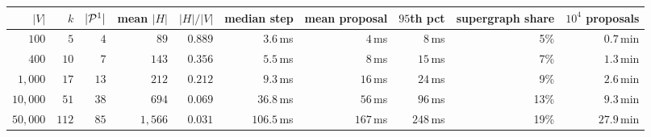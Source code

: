 \begin{tabular}{rrrrrrrrrr}
\toprule
$|V|$ & $k$ & $|\mathcal{P}^1|$ & mean $|H|$ & $|H|/|V|$ & median step & mean proposal & $95$th pct & supergraph share & $10^4$ proposals \\
\midrule
$100$ & $5$ & $4$ & $89$ & $0.889$ & $3.6$\,ms & $4$\,ms & $8$\,ms & 5\% & $0.7$\,min \\
$400$ & $10$ & $7$ & $143$ & $0.356$ & $5.5$\,ms & $8$\,ms & $15$\,ms & 7\% & $1.3$\,min \\
$1{,}000$ & $17$ & $13$ & $212$ & $0.212$ & $9.3$\,ms & $16$\,ms & $24$\,ms & 9\% & $2.6$\,min \\
$10{,}000$ & $51$ & $38$ & $694$ & $0.069$ & $36.8$\,ms & $56$\,ms & $96$\,ms & 13\% & $9.3$\,min \\
$50{,}000$ & $112$ & $85$ & $1{,}566$ & $0.031$ & $106.5$\,ms & $167$\,ms & $248$\,ms & 19\% & $27.9$\,min \\
\bottomrule
\end{tabular}
